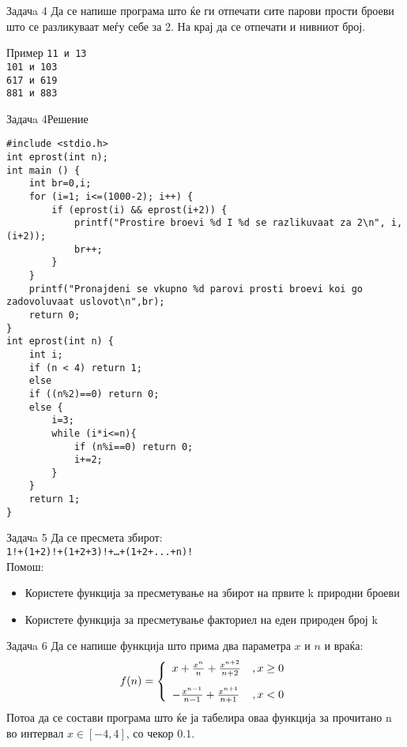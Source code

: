 \begin{frame}{Задачa 4}
Да се напише програма што ќе ги отпечати сите парови прости броеви што се разликуваат меѓу себе за 2. 
На крај да се отпечати и нивниот број.
\begin{exampleblock}{Пример}
\texttt{11 и 13}\\
\texttt{101 и 103}\\
\texttt{617 и 619}\\
\texttt{881 и 883}
\end{exampleblock}
\end{frame}

\begin{frame}[fragile]{Задачa 4}{Решение}
\begin{lstlisting}
#include <stdio.h>
int eprost(int n);
int main () {
    int br=0,i;
    for (i=1; i<=(1000-2); i++) {
        if (eprost(i) && eprost(i+2)) {
            printf("Prostire broevi %d I %d se razlikuvaat za 2\n", i, (i+2));
            br++;
        }
    }
    printf("Pronajdeni se vkupno %d parovi prosti broevi koi go zadovoluvaat uslovot\n",br);
    return 0;
}
int eprost(int n) {
    int i;
    if (n < 4) return 1;
    else
    if ((n%2)==0) return 0;
    else {
        i=3;
        while (i*i<=n){
            if (n%i==0) return 0;
            i+=2;
        }
    }
    return 1;
} 
\end{lstlisting}
\end{frame}

\begin{frame}{Задачa 5}
Да се пресмета збирот:\\
\texttt{1!+(1+2)!+(1+2+3)!+\ldots+(1+2+...+n)!}
\\Помош:\\
\begin{itemize}
    \item Користете функција за пресметување на збирот на првите k природни
  броеви
    \item Користете функција за пресметување факториел на еден природен број k
\end{itemize}
\end{frame}

\begin{frame}{Задачa 6}
Да се напише функција што прима два параметра $x$ и $n$ и враќа:
\[
   f(n) = \left\{ 
  \begin{array}{l l}
    x + \frac{x^n}{n} + \frac{x^{n+2}}{n + 2} &,x\geq0\\[10px]
    - \frac{x^{n - 1}}{n - 1} + \frac{x^{n+1}}{n + 1} &,x<0
  \end{array} \right.
\]
Потоа да се состави програма што ќе ја табелира оваа функција за прочитано n во
интервал $x\in[-4, 4]$, со чекор $0.1$.
\end{frame}

